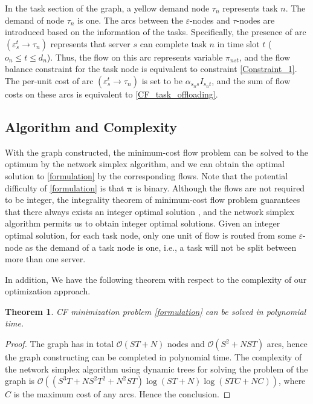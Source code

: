 \documentclass[conference, 10pt, ﬁnal, letterpaper, twocolumn]{IEEEtran}
\newtheorem{theorem}{Theorem}
\begin{document}
In the task section of the graph, a yellow demand node $\tau_n$ represents task $n$. The demand of node $\tau_n$ is one. The arcs between the $\varepsilon$-nodes and $\tau$-nodes are introduced based on the information of the tasks. Specifically, the presence of arc $(\varepsilon^{t}_{s}\rightarrow\tau_{n})$ represents that server $s$ can complete task $n$ in time slot $t$ ($o_n \leq t \leq d_n$). Thus, the flow on this arc represents variable $\pi_{nst}$, and the flow balance constraint for the task node is equivalent to constraint \eqref{Constraint_1}.
The per-unit cost of arc $(\varepsilon^{t}_{s}\rightarrow\tau_n)$ is set to be $\alpha_{s_{n}s}I_{s_{n}t}$, and the sum of flow costs on these arcs is equivalent to \eqref{CF_task_offloading}.

\subsection{Algorithm and Complexity}

With the graph constructed, the minimum-cost flow problem can be solved to the optimum by the network simplex algorithm\cite{Ahuja1993NetworkFlows}, and we can obtain the optimal solution to \eqref{formulation} by the corresponding flows. Note that the potential difficulty of \eqref{formulation} is that $\boldsymbol{\pi}$ is binary. Although the flows are not required to be integer, the integrality theorem of minimum-cost flow problem guarantees that there always exists an integer optimal solution \cite[Theorem 11.5]{Ahuja1993NetworkFlows}, and the network simplex algorithm permits us to obtain integer optimal solutions. Given an integer optimal solution, for each task node, only one unit of flow is routed from some $\varepsilon$-node as the demand of a task node is one, i.e., a task will not be split between more than one server.

In addition, We have the following theorem with respect to the complexity of our optimization approach.

\begin{theorem}
CF minimization problem \eqref{formulation} can be solved in polynomial time.
\end{theorem}
\begin{proof}
The graph has in total $\mathcal{O}(ST + N)$ nodes and $\mathcal{O}(S^2 + NST)$ arcs, hence the graph constructing can be completed in polynomial time. The complexity of the network simplex algorithm using dynamic trees \cite{tarjan1997dynamic} for solving the problem of the graph is $\mathcal{O}((S^3T + NS^2 T^2+N^2ST)\log(ST + N)\log(STC + NC))$, where $C$ is the maximum cost of any arcs. Hence the conclusion.
\end{proof}
\end{document}
